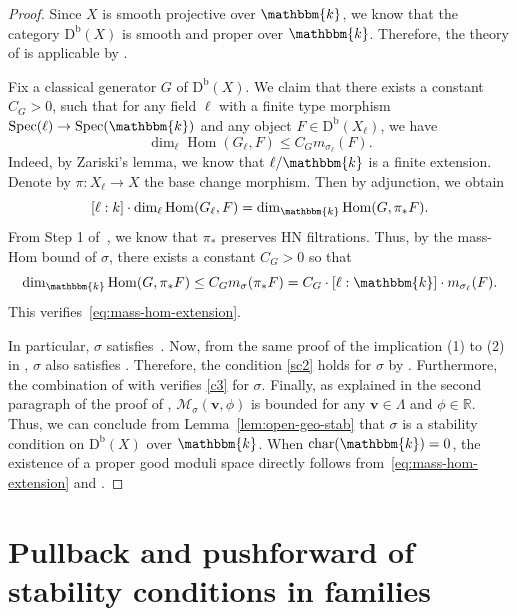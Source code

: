\documentclass[11pt, reqno]{amsart}
\numberwithin{equation}{section}
\theoremstyle{plain}
\theoremstyle{remark}
\theoremstyle{definition}
\theoremstyle{italicsname}
\newcommand{\bv}{\mathbf{v}}
\newcommand{\Db}{\mathrm{D^b}}
\DeclareMathOperator{\Spec}{Spec}
\DeclareMathOperator{\Hom}{Hom}
\newcommand{\cM}{\mathcal{M}}
\newcommand{\KK}{\mathbbm{k}}
\def\RR{\ensuremath{\mathbb{R}}}
\begin{document}
\begin{proof}
Since $X$ is smooth projective over $\KK$, we know that the category $\Db(X)$ is smooth and proper over $\KK$. 
Therefore, the theory of \cite{DHL-robotis} is applicable by \cite[Example 2.29]{DHL-robotis}. 

Fix a classical generator $G$ of $\Db(X)$. 
We claim that there exists a constant $C_G>0$, such that for any field $\ell$ with a finite type morphism $\Spec(\ell)\to\Spec(\KK)$ and any object $F\in\Db(X_{\ell})$, we have
\begin{equation}\label{eq:mass-hom-extension}
\dim_{\ell} \Hom(G_{\ell},F)\leq C_Gm_{\sigma_{\ell}}(F).
\end{equation}
Indeed, by Zariski's lemma, we know that $\ell/\KK$ is a finite extension. 
Denote by $\pi\colon X_{\ell}\to X$ the base change morphism. 
Then by adjunction, we obtain
\[
[\ell:k]\cdot \dim_{\ell} \Hom(G_{\ell},F)=\dim_\KK \Hom(G,\pi_*F).
\]
From Step 1 of~\cite[Theorem 12.17]{stability-families}, we know that $\pi_*$ preserves HN filtrations. 
Thus, by the mass-Hom bound of $\sigma$, there exists a constant $C_G>0$ so that
\[
\dim_\KK \Hom(G,\pi_*F)\leq C_Gm_{\sigma}(\pi_*F)=C_G\cdot [\ell:\KK]\cdot m_{\sigma_{\ell}}(F).
\]
This verifies~\eqref{eq:mass-hom-extension}. 

In particular, $\sigma$ satisfies~\cite[Theorem 2.35(1)]{DHL-robotis}. 
Now, from the same proof of the implication (1) to (2) in \cite[Theorem 2.35]{DHL-robotis}, $\sigma$ also satisfies \cite[Theorem 2.35(2)]{DHL-robotis}. 
Therefore, the condition \ref{sc2} holds for $\sigma$ by \cite[Proposition 2.38]{DHL-robotis}. Furthermore, the combination of \cite[Theorem 18.7, 5.7]{stability-families} with \cite[Proposition 2.38]{DHL-robotis} verifies \ref{c3} for $\sigma$. 
Finally, as explained in the second paragraph of the proof of \cite[Proposition 2.41]{DHL-robotis}, $\cM_{\sigma}(\bv,\phi)$ is bounded for any $\bv\in \Lambda$ and $\phi\in \RR$. 
Thus, we can conclude from Lemma~\ref{lem:open-geo-stab} that $\sigma$ is a stability condition on $\Db(X)$ over $\KK$. 
When $\mathrm{char}(\KK)=0$, the existence of a proper good moduli space directly follows from~\eqref{eq:mass-hom-extension} and \cite[Theorem 2.35]{DHL-robotis}.
\end{proof}



\section{Pullback and pushforward of stability conditions in families}\label{sec:PullPushRelativeStability}
\end{document}
